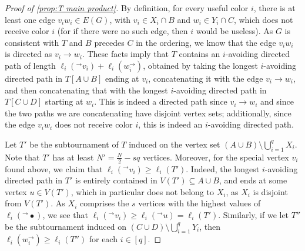 \documentclass[10pt,a4paper]{amsart}
\begin{document}
\begin{proof}[Proof of \cref{prop:T main product}]
    By definition, for every useful color $i$, there is at least one edge $v_iw_i\in E(G)$, with $v_i \in X_i \cap B$ and $w_i \in Y_i \cap C$, which does not receive color $i$ (for if there were no such edge, then $i$ would be useless). As $G$ is consistent with $T$ and $B$ precedes $C$ in the ordering, we know that the edge $v_iw_i$ is directed as $v_i\to w_i$. These facts imply that $T$ contains an $i$-avoiding directed path of length $\ell_i(^\to v_i)+\ell_i(w_i^\to)$, obtained by taking the longest $i$-avoiding directed path in $T[A\cup B]$ ending at $v_i$, concatenating it with the edge $v_i\to w_i$, and then concatenating that with the longest $i$-avoiding directed path in $T[C\cup D]$ starting at $w_i$. This is indeed a directed path since $v_i \to w_i$ and since the two paths we are concatenating have disjoint vertex sets; additionally, since the edge $v_i w_i$ does not receive color $i$, this is indeed an $i$-avoiding directed path.

    Let $T'$ be the subtournament of $T$ induced on the vertex set $(A \cup B) \setminus \bigcup_{i=1}^q X_i$. Note that $T'$ has at least $N'=\frac N2 - sq$ vertices. Moreover, for the special vertex $v_i$ found above, we claim that $\ell_i(^\to v_i) \geq \ell_i(T')$. Indeed, the longest $i$-avoiding directed path in $T'$ is entirely contained in $V(T')\subseteq A\cup B$, and ends at some vertex $u \in V(T')$, which in particular does not belong to $X_i$, as $X_i$ is disjoint from $V(T')$. As $X_i$ comprises the $s$ vertices with the highest values of $\ell_i(^\to \bullet)$, we see that $\ell_i(^\to v_i) \geq \ell_i(^\to u)=\ell_i(T')$.  Similarly, if we let $T''$ be the subtournament induced on $(C \cup D) \setminus \bigcup_{i=1}^q Y_i$, then $\ell_i(w_i^\to) \geq \ell_i(T'')$ for each $i \in [q]$. 


\end{proof}
\end{document}
